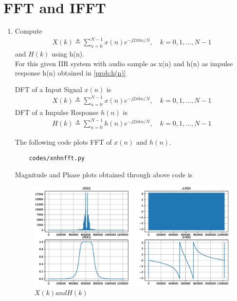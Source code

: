 \documentclass[journal,12pt,twocolumn]{IEEEtran}
\renewcommand\thesection{\arabic{section}}
\begin{document}
\section{FFT and IFFT}
\begin{enumerate}[label=\thesection.\arabic*
,ref=\thesection.\theenumi]
\item Compute
\begin{align}
        X(k) \triangleq \sum_{n=0}^{N-1} x(n) e^{-j 2 \pi k n / N}, \quad k=0,1, \ldots, N-1
\end{align}
and $H(k)$ using h(n).
\\
\solution
For this given IIR system with audio sample as x(n) and h(n) as impulse response h(n) obtained in \ref{prob:h(n)} 

DFT of a Input Signal $x(n)$ is 
\begin{align}
    X(k) \triangleq \sum_{n=0}^{N-1} x(n) e^{-j 2 \pi k n / N}, \quad k=0,1, \ldots, N-1
\end{align}
DFT of a Impulse Response $h(n)$ is 
\begin{align}
    H(k) \triangleq \sum_{n=0}^{N-1} h(n) e^{-j 2 \pi k n / N}, \quad k=0,1, \ldots, N-1
\end{align}

The following code plots FFT of $x(n)$ and $h(n)$.
\begin{lstlisting}
    codes/xnhnfft.py
\end{lstlisting}
Magnitude and Phase plots obtained through above code is 
\begin{figure}[!ht]
\centering
\includegraphics[width=\columnwidth]{./figs/xnhnfft.eps}
\caption{$X(k) and H(k)$}
\label{fig:xnhnfft}
\end{figure}


\end{enumerate}
\end{document}
